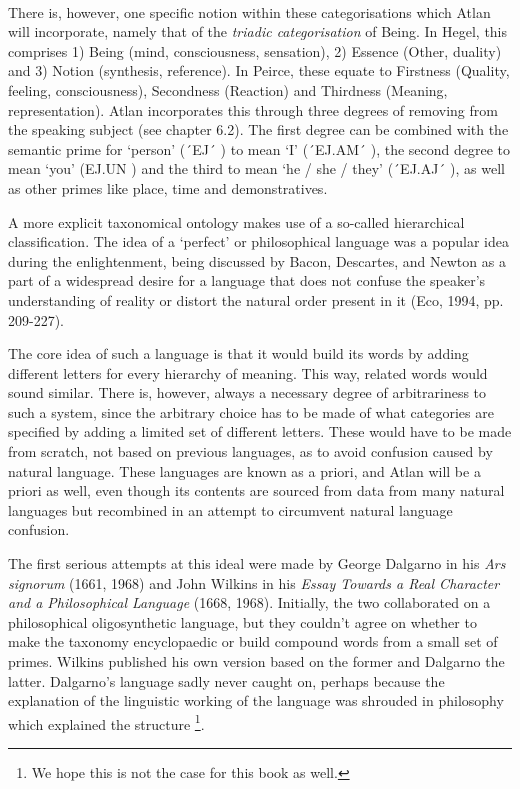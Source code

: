 \phantom{.}\\

There is, however, one specific notion within these categorisations which Atlan will incorporate, namely that of the {\it triadic categorisation} of Being. In Hegel, this comprises 1) Being (mind, consciousness, sensation), 2) Essence (Other, duality) and 3) Notion (synthesis, reference). In Peirce, these equate to Firstness (Quality, feeling, consciousness), Secondness (Reaction) and Thirdness (Meaning, representation). Atlan incorporates this through three degrees of removing from the speaking subject (see chapter 6.2). The first degree can be combined with the semantic prime for ‘person’ (´EJ´ \ej) to mean ‘I’ (´EJ.AM´ \ej \am), the second degree to mean ‘you’ (EJ.UN \ej \un) and the third to mean ‘he / she / they’ (´EJ.AJ´ \ej \aj), as well as other primes like place, time and demonstratives. 

\vspace{-0.1cm}
A more explicit taxonomical ontology makes use of a so-called hierarchical classification. The idea of a ‘perfect’ or philosophical language was a popular idea during the enlightenment, being discussed by Bacon, Descartes, and Newton as a part of a widespread desire for a language that does not confuse the speaker’s understanding of reality or distort the natural order present in it (Eco, 1994, pp. 209-227). 

The core idea of such a language is that it would build its words by adding different letters for every hierarchy of meaning. This way, related words would sound similar. There is, however, always a necessary degree of arbitrariness to such a system, since the arbitrary choice has to be made of what categories are specified by adding a limited set of different letters. These would have to be made from scratch, not based on previous languages, as to avoid confusion caused by natural language. These languages are known as a priori, and Atlan will be a priori as well, even though its contents are sourced from data from many natural languages but recombined in an attempt to circumvent natural language confusion.  

The first serious attempts at this ideal were made by George Dalgarno in his {\it Ars signorum} (1661, 1968) and John Wilkins in his \textit{Essay Towards a Real Character and a Philosophical Language} (1668, 1968). Initially, the two collaborated on a philosophical oligosynthetic language, but they couldn’t agree on whether to make the taxonomy encyclopaedic or build compound words from a small set of primes. Wilkins published his own version based on the former and Dalgarno the latter. Dalgarno’s language sadly never caught on, perhaps because the explanation of the linguistic working of the language was shrouded in philosophy which explained the structure \footnote{We hope this is not the case for this book as well.}. 

